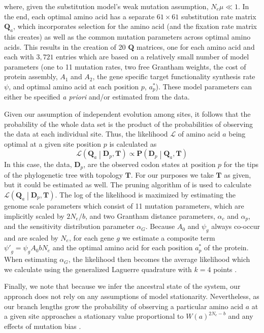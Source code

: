 \documentclass[onecolumn,letterpaper,fleqn,nogrid]{myMBE}%
\newcommand{\Ne}{\ensuremath{{N_e}}\xspace} %
\newcommand{\Lik}{\ensuremath{\mathcal{L}}\xspace}%
\newcommand{\Pmatrix}{\ensuremath{\mathbf{P}}\xspace}
\newcommand{\Tmatrix}{\ensuremath{\mathbf{T}}\xspace}
\newcommand{\Dmatrixp}{\ensuremath{\mathbf{D}_p}\xspace}
\newcommand{\Qmatrix}{\ensuremath{\mathbf{Q}}\xspace}
\newcommand{\Qmatrixa}{\ensuremath{\Qmatrix_a}\xspace}
\newcommand{\alphac}{\ensuremath{\alpha_c}\xspace}
\newcommand{\alphag}{\ensuremath{\alpha_G}\xspace}
\newcommand{\alphap}{\ensuremath{\alpha_p}\xspace}
\newcommand{\aoptp}{\ensuremath{a^*_p}\xspace}
\newcommand{\psiprime}{\ensuremath{\psi'}\xspace}
\begin{document}
where, given the substitution model's weak mutation assumption, $\Ne \mu \ll 1$.
In the end, each optimal amino acid has a separate $61 \times 61$ substitution rate matrix \Qmatrixa, which incorporates selection for the amino acid (and the fixation rate matrix this creates) as well as the common mutation parameters across optimal amino acids.
This results in the creation of 20 \Qmatrix matrices, one for each amino acid and each with $3,721$ entries which are based on a relatively small number of model parameters (one to 11 mutation rates, two free Grantham weights, the cost of protein assembly, $A_1$ and $A_2$, the gene specific target functionality synthesis rate $\psi$, and optimal amino acid at each position $p$, \aoptp).
These model parameters can either be specified \emph{a priori} and/or estimated from the data.


Given our assumption of independent evolution among sites, it follows that the probability of the whole data set is the product of the probabilities of observing the data at each individual site.
Thus, the likelihood $\Lik$ of amino acid $a$ being optimal at a given site position $p$ is calculated as
\begin{equation}
\Lik\left(\Qmatrixa\middle| \Dmatrixp, \Tmatrix\right) \propto \Pmatrix\left(\Dmatrixp\middle|\Qmatrixa,\Tmatrix\right)
\end{equation}
In this case, the data, $\Dmatrixp$, are the observed codon states at position $p$ for the tips of the phylogenetic tree with topology $\Tmatrix$.
For our purposes we take \Tmatrix as given, but it could be estimated as well.
The pruning algorithm of \citet{Felsenstein1981} is used to calculate $\Lik\left(\Qmatrixa \middle| \Dmatrixp, \Tmatrix\right)$.
The log of the likelihood is maximized by estimating the genome scale parameters which consist of 11 mutation parameters, which are implicitly scaled by $2 \Ne/b$, and two Grantham distance parameters, $\alphac$ and $\alphap$, and the sensitivity distribution parameter \alphag.
Because $A_0$ and $\psi_g$ always co-occur and are scaled by \Ne, for each gene $g$ we estimate a composite term $\psiprime_g = \psi_g A_0 b \Ne$ and the optimal amino acid for each position \aoptp of the protein.
When estimating \alphag, the likelihood then becomes the average likelihood which we calculate using the generalized Laguerre quadrature with $k = 4$ points \citep{Felsenstein2001}.


Finally, we note that because we infer the ancestral state of the system, our approach does not rely on any assumptions of model stationarity.
Nevertheless, as our branch lengths grow the probability of observing a particular amino acid $a$ at a given site approaches a stationary value proportional to $W(a)^{2 \Ne -b}$ and any effects of mutation bias \citep{SellaAndHirsh2005}.
\end{document}
